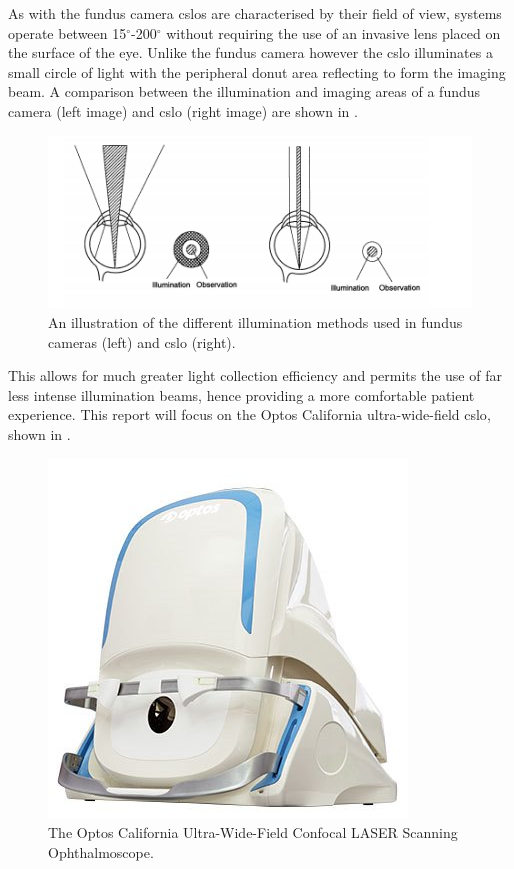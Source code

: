As with the fundus camera \Gls{cslo}s are characterised by their field of view,
systems operate between 15$^\circ$-200$^\circ$ without requiring the use
of an invasive lens placed on the surface of the eye. Unlike the fundus
camera however the \Gls{cslo} illuminates a small circle of light with the peripheral 
donut area reflecting to form the imaging beam. A comparison between the illumination and imaging areas of a fundus camera (left image) and \Gls{cslo} (right image) are shown in  .

\begin{figure}[H]
\centering
\includegraphics{figures/illumination}
\caption{An illustration of the different illumination methods used in fundus cameras (left) and \Gls{cslo} (right).\cite{5_bennett_2015}}
\label{fig:illum}
   \end{figure}

This allows for much greater light collection efficiency and permits the use
of far less intense illumination beams, hence providing a more comfortable
patient experience.\cite{5_bennett_2015} This report will focus on the Optos
California ultra-wide-field \Gls{cslo}, shown in .

\begin{figure}[H]
\centering
\includegraphics{figures/california}
\caption{The Optos California Ultra-Wide-Field Confocal \gls{LASER} Scanning Ophthalmoscope.\cite{1_optos.com_2015}}
\label{fig:cali}
   \end{figure}


